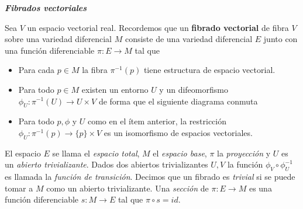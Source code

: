 \documentclass[11pt]{article}
\numberwithin{theorem}{subsection}
\begin{document}
\textsl{\textbf{Fibrados vectoriales}}

Sea $V$ un espacio vectorial real. Recordemos que un \textbf{fibrado vectorial} de fibra $V$ sobre una variedad diferencial $M$ consiste de una variedad diferencial $E$ junto con una funci\'on diferenciable $\pi:E\to M$ tal que
\begin{itemize} 
	\item Para cada $p\in M$ la fibra $\pi^{-1}(p)$ tiene estructura de espacio vectorial.
	\item Para todo $p\in M$ existen un entorno $U$ y un difeomorfismo $\phi_U:\pi^{-1}(U)\to U\times V$ de forma que el siguiente diagrama conmuta
	\begin{center}
	\end{center}
	\item Para todo $p,\phi$ y $U$ como en el \'item anterior, la restricci\'on $\phi_U:\pi^{-1}(p)\to \{p\}\times V$ es un isomorfismo de espacios vectoriales.
\end{itemize}
El espacio $E$ se llama el \textit{espacio total}, $M$ el \textit{espacio base}, $\pi$ la \textit{proyecci\'on} y $U$ es un \textit{abierto trivializante}. Dados dos abiertos trivializantes $U,V$ la funci\'on $\phi_V\circ\phi_U^{-1}$ es llamada la \textit{funci\'on de transici\'on}. Decimos que un fibrado es \textit{trivial} si se puede tomar a $M$ como un abierto trivializante. Una \textit{secci\'on} de $\pi:E\to M$ es una funci\'on diferenciable $s:M\to E$ tal que $\pi\circ s = id$.
\end{document}

